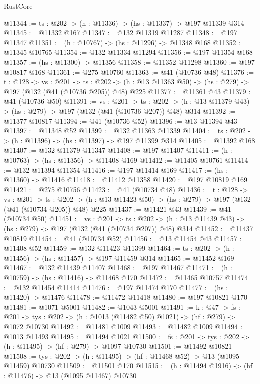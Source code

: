 \begin{lexlean}{RustCore}
\begin{coremodule}
@11344 := {ts : @202} -> (h : @11336) -> (hs : @11337) -> @197 @11339 @314
@11345 := @11332 @167
@11347 := @132 @11319 @11287
@11348 := @197 @11347
@11351 := (h : @10767) -> (hs : @11296) -> @11348 @168
@11352 := @11345 @10765
@11354 := @132 @11334 @11294
@11356 := @197 @11354 @168
@11357 := (hs : @11300) -> @11356
@11358 := @11352 @11298
@11360 := @197 @10817 @168
@11361 := @275 @10760
@11363 := @41 (@10736 @48)
@11376 := {t : @128} ->
  {vs : @201} ->
  {ts : @202} -> (h : @13 @11363 @50) -> (hs : @279) -> @197 (@132 (@41 (@10736 @205)) @48) @225
@11377 := @11361 @43
@11379 := @41 (@10736 @50)
@11391 := {vs : @201} ->
  {ts : @202} -> (h : @13 @11379 @43) -> (hs : @279) -> @197 (@132 (@41 (@10736 @207)) @48) @314
@11392 := @11377 @10817
@11394 := @41 (@10736 @52)
@11396 := @13 @11394 @43
@11397 := @11348 @52
@11399 := @132 @11363 @11339
@11404 := {ts : @202} -> (h : @11396) -> (hs : @11397) -> @197 @11399 @314
@11405 := @11392 @168
@11407 := @132 @11379 @11347
@11408 := @197 @11407
@11411 := (h : @10763) -> (hs : @11356) -> @11408 @169
@11412 := @11405 @10761
@11414 := @132 @11394 @11354
@11416 := @197 @11414 @169
@11417 := (hs : @11360) -> @11416
@11418 := @11412 @11358
@11420 := @197 @10819 @169
@11421 := @275 @10756
@11423 := @41 (@10734 @48)
@11436 := {t : @128} ->
  {vs : @201} ->
  {ts : @202} -> (h : @13 @11423 @50) -> (hs : @279) -> @197 (@132 (@41 (@10734 @205)) @48) @225
@11437 := @11421 @43
@11439 := @41 (@10734 @50)
@11451 := {vs : @201} ->
  {ts : @202} -> (h : @13 @11439 @43) -> (hs : @279) -> @197 (@132 (@41 (@10734 @207)) @48) @314
@11452 := @11437 @10819
@11454 := @41 (@10734 @52)
@11456 := @13 @11454 @43
@11457 := @11408 @52
@11459 := @132 @11423 @11399
@11464 := {ts : @202} -> (h : @11456) -> (hs : @11457) -> @197 @11459 @314
@11465 := @11452 @169
@11467 := @132 @11439 @11407
@11468 := @197 @11467
@11471 := (h : @10759) -> (hs : @11416) -> @11468 @170
@11472 := @11465 @10757
@11474 := @132 @11454 @11414
@11476 := @197 @11474 @170
@11477 := (hs : @11420) -> @11476
@11478 := @11472 @11418
@11480 := @197 @10821 @170
@11481 := @1071 @5001
@11482 := @1043 @5001
@11491 := {k : @47} ->
  {fs : @201} -> {tys : @202} -> (h : @1013 (@11482 @50) @1021) -> (hf : @279) -> @1072 @10730
@11492 := @11481 @1009
@11493 := @11482 @1009
@11494 := @1013 @11493
@11495 := @11494 @1021
@11500 := {fs : @201} -> {tys : @202} -> (h : @11495) -> (hf : @279) -> @1097 @10730
@11501 := @11492 @10821
@11508 := {tys : @202} -> (h : @11495) -> (hf : @11468 @52) -> @13 (@1095 @11459) @10730
@11509 := @11501 @170
@11515 := (h : @11494 @1916) -> (hf : @11476) -> @13 (@1095 @11467) @10730

\end{coremodule}
\end{lexlean}
